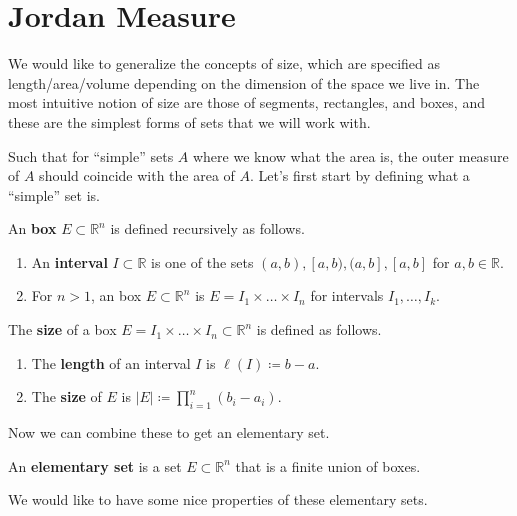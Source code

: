\section{Jordan Measure}

  We would like to generalize the concepts of size, which are specified as length/area/volume depending on the dimension of the space we live in. The most intuitive notion of size are those of segments, rectangles, and boxes, and these are the simplest forms of sets that we will work with. 

  Such that for ``simple'' sets $A$ where we know what the area is, the outer measure of $A$ should coincide with the area of $A$. Let's first start by defining what a ``simple'' set is. 

  \begin{definition}[Box] 
    An \textbf{box} $E \subset \mathbb{R}^n$ is defined recursively as follows. 
    \begin{enumerate}
      \item An \textbf{interval} $I \subset \mathbb{R}$ is one of the sets $(a, b), [a, b), (a, b], [a, b]$ for $a, b \in \mathbb{R}$. 
      \item For $n > 1$, an box $E \subset \mathbb{R}^n$ is $E = I_1 \times \ldots \times I_n$ for intervals $I_1, \ldots, I_k$. 
    \end{enumerate}
  \end{definition} 

  \begin{definition}
    The \textbf{size} of a box $E = I_1 \times \ldots \times I_n \subset \mathbb{R}^n$ is defined as follows. 
    \begin{enumerate}
      \item The \textbf{length} of an interval $I$ is $\ell(I) \coloneqq b - a$. 
      \item The \textbf{size} of $E$ is $|E| \coloneqq \prod_{i=1}^n (b_i - a_i)$. 
    \end{enumerate}
  \end{definition} 

  Now we can combine these to get an elementary set. 

  \begin{definition}
    An \textbf{elementary set} is a set $E \subset \mathbb{R}^n$ that is a finite union of boxes. 
  \end{definition}

  We would like to have some nice properties of these elementary sets. 

